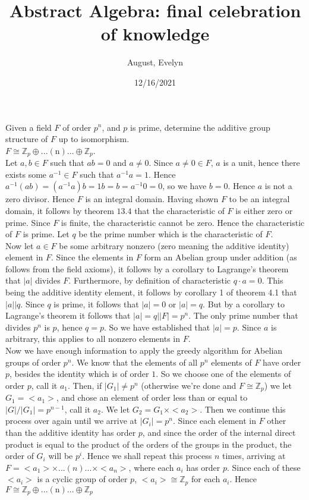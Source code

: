 \documentclass{article}
\title{Abstract Algebra: final celebration of knowledge}
\author{August, Evelyn}
\date{12/16/2021}
\theoremstyle{definition}
\newcommand{\Z}{\mathbb{Z}}
\begin{document}
\maketitle

 Given a field $F$ of order $p^n$, and $p$ is prime, determine the additive group structure of $F$ up to isomorphism.\\

 $F \cong \Z_p\oplus...(\mbox{n})...\oplus\Z_p$.\\

 Let $a,b\in F$ such that $ab = 0$ and $a\ne 0$. Since $a\ne 0\in F$, $a$ is a unit, hence there exists some $a^{-1}\in F$ such that $a^{-1}a = 1$. Hence $a^{-1}(ab) = (a^{-1}a)b = 1b = b = a^{-1} 0 = 0$, so we have $b = 0$. Hence $a$ is not a zero divisor. Hence $F$ is an integral domain. Having shown $F$ to be an integral domain, it follows by theorem $13.4$ that the characteristic of $F$ is either zero or prime. Since $F$ is finite, the characteristic cannot be zero. Hence the characteristic of $F$ is prime. Let $q$ be the prime number which is the characteristic of $F$.\\

Now let $a\in F$ be some arbitrary nonzero (zero meaning the additive identity) element in $F$. Since the elements in $F$ form an Abelian group under addition (as follows from the field axioms), it follows by a corollary to Lagrange's theorem that $|a|$ divides $F$. Furthermore, by definition of characteristic $q\cdot a = 0$. This being the additive identity element, it follows by corollary 1 of theorem 4.1 that $|a|\big | q$. Since $q$ is prime, it follows that $|a| = 0$ or $|a| = q$. But by a corollary to Lagrange's theorem it follows that $|a| = q \big | |F| = p^n$. The only prime number that divides $p^n$ is $p$, hence $q = p$. So we have established that $|a| = p$. Since $a$ is arbitrary, this applies to all nonzero elements in $F$.\\

Now we have enough information to apply the greedy algorithm for Abelian groups of order $p^n$. We know that the elements of all $p^n$ elements of $F$ have order $p$, besides the identity which is of order $1$. So we choose one of the elements of order $p$, call it $a_1$. Then, if $|G_1|\ne p^n$ (otherwise we're done and $F \cong \Z_p$) we let $G_1 = <a_1>$, and chose an element of order less than or equal to $|G|/|G_1| = p^{n-1}$, call it $a_2$. We let $G_2 = G_1\times <a_2>$. Then we continue this process over again until we arrive at $|G_i| = p^n$. Since each element in $F$ other than the additive identity has order $p$, and since the order of the internal direct product is equal to the product of the orders of the groups in the product, the order of $G_i$ will be $p^i$. Hence we shall repeat this process $n$ times, arriving at $F = <a_1>\times ...(n) ...\times <a_n>$, where each $a_i$ has order $p$. Since each of these $<a_i>$ is a cyclic group of order $p$, $<a_i>\cong \Z_p$ for each $a_i$. Hence $F \cong \Z_p\oplus...(\mbox{n})...\oplus\Z_p$\\
\end{document}
